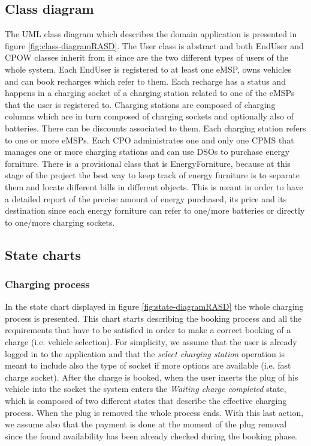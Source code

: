 \documentclass[a4paper]{report}
\begin{document}
\subsection{Class diagram}
The UML class diagram which describes the domain application is presented in figure \ref{fig:class-diagramRASD}. The User class is abstract and both EndUser and CPOW classes inherit from it since are the two different types of users of the whole system. Each EndUser is registered to at least one eMSP, owns vehicles and can book recharges which refer to them. Each recharge has a status and happens in a charging socket of a charging station related to one of the eMSPs that the user is registered to. Charging stations are composed of charging columns which are in turn composed of charging sockets and optionally also of batteries. There can be discounts associated to them. Each charging station refers to one or more eMSPs. Each CPO administrates one and only one CPMS that manages one or more charging stations and can use DSOs to purchase energy forniture. There is a provisional class that is EnergyForniture, because at this stage of the project the best way to keep track of energy furniture is to separate them and locate different bills in different objects. This is meant in order to have a detailed report of the precise amount of energy purchased, its price and its destination since each energy forniture can refer to one/more batteries or directly to one/more charging sockets.

\subsection{State charts}
\subsubsection{Charging process}
In the state chart displayed in figure \ref{fig:state-diagramRASD} the whole charging process is presented. This chart starts describing the booking process and all the requirements that have to be satisfied in order to make a correct booking of a charge (i.e. vehicle selection).  For simplicity, we assume that the user is already logged in to the application and that the \textit{select charging station} operation is meant to include also the type of socket if more options are available (i.e. fast charge socket). After the charge is booked, when the user inserts the plug of his vehicle into the socket the system enters the \textit{Waiting charge completed} state, which is composed of two different states that describe the effective charging process. When the plug is removed the whole process ends. With this last action, we assume also that the payment is done at the moment of the plug removal since the found availability has been already checked during the booking phase.
\end{document}
